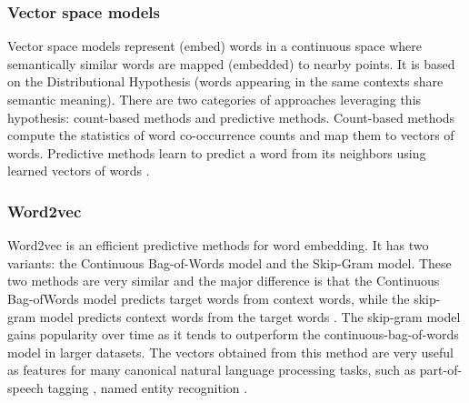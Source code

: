 \documentclass[12pt]{WSUThesis}
\theoremstyle{definition}
\begin{document}
\subsubsection{Vector space models}
Vector space models represent (embed) words in a continuous space where semantically similar words are mapped (embedded) to nearby points.
It is based on the Distributional Hypothesis (words appearing in the same contexts share semantic meaning).
There are two categories of approaches leveraging this hypothesis: count-based methods and predictive methods.
Count-based methods compute the statistics of word co-occurrence counts and map them to vectors of words. Predictive methods learn to predict a word from its neighbors using learned vectors of words \cite{baroni2014don}.

\subsubsection{Word2vec}
Word2vec is an efficient predictive methods for word embedding. It has two variants: the Continuous Bag-of-Words model and the Skip-Gram model.
These two methods are very similar and the major difference is that the Continuous Bag-ofWords model predicts target words from context words, while the skip-gram model predicts context words from the target words \cite{levy2014dependency}.
The skip-gram model gains popularity over time as it tends to outperform the continuous-bag-of-words model in larger datasets.
The vectors obtained from this method are very useful as features for many canonical natural language processing tasks, such as part-of-speech tagging \cite{collobert2011natural}, named entity recognition \cite{turian2010word}.
\end{document}
